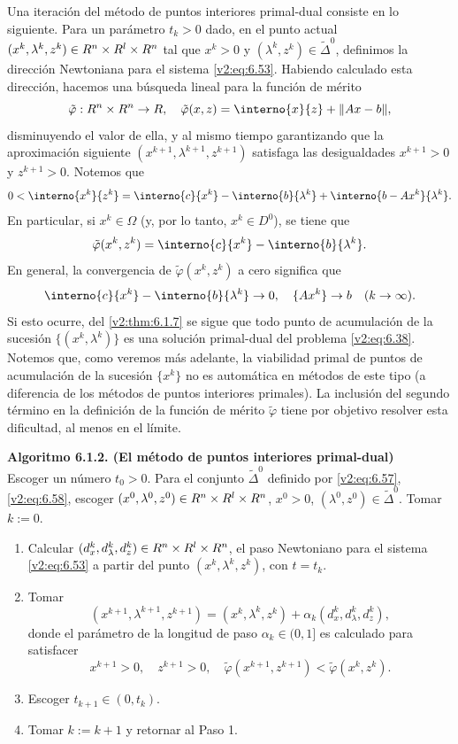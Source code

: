 Una iteración del método de puntos interiores primal-dual consiste en lo siguiente. Para un parámetro $t_k > 0$ dado, en el punto actual $(x^k, \lambda^k, z^k) \in R^n \times R^l \times R^n$ tal que $x^k > 0$ y $(\lambda^k, z^k) \in \tilde{\Delta}^0$, definimos la dirección Newtoniana para el sistema \eqref{v2:eq:6.53}. Habiendo calculado esta dirección, hacemos una búsqueda lineal para la función de mérito
\begin{equation}
    \tilde{\varphi} : \Rn \times \Rn \to \R, \quad \tilde{\varphi}(x, z) = \interno{x}{z} + \norm{Ax - b},
    \label{v2:eq:6.60}
\end{equation}
disminuyendo el valor de ella, y al mismo tiempo garantizando que la aproximación siguiente $(x^{k+1}, \lambda^{k+1}, z^{k+1})$ satisfaga las desigualdades $x^{k+1} > 0$ y $z^{k+1} > 0$. Notemos que
\[
    0 < \interno{x^k}{z^k} = \interno{c}{x^k} - \interno{b}{\lambda^k} + \interno{b - Ax^k}{\lambda^k}.
\]
En particular, si $x^k \in \Omega$ (y, por lo tanto, $x^k \in D^0$), se tiene que
\[
    \tilde{\varphi}(x^k, z^k) = \interno{c}{x^k} - \interno{b}{\lambda^k}.
\]
En general, la convergencia de $\tilde{\varphi}(x^k, z^k)$ a cero significa que
\[
    \interno{c}{x^k} - \interno{b}{\lambda^k} \to 0, \quad \{A x^k\} \to b \quad (k \to \infty).
\]
Si esto ocurre, del \cref{v2:thm:6.1.7} se sigue que todo punto de acumulación de la sucesión $\{(x^k, \lambda^k)\}$ es una solución primal-dual del problema \eqref{v2:eq:6.38}. Notemos que, como veremos más adelante, la viabilidad primal de puntos de acumulación de la sucesión $\{x^k\}$ no es automática en métodos de este tipo (a diferencia de los métodos de puntos interiores primales). La inclusión del segundo término en la definición de la función de mérito $\tilde{\varphi}$ tiene por objetivo resolver esta dificultad, al menos en el límite.

\vspace{0.3cm}
\noindent \textbf{Algoritmo 6.1.2. (El método de puntos interiores primal-dual)} \\
Escoger un número $t_0 > 0$. Para el conjunto $\tilde{\Delta}^0$ definido por \eqref{v2:eq:6.57}, \eqref{v2:eq:6.58}, escoger $(x^0, \lambda^0, z^0) \in R^n \times R^l \times R^n$, $x^0 > 0$, $(\lambda^0, z^0) \in \tilde{\Delta}^0$. Tomar $k := 0$.
\begin{enumerate}[label=\arabic*., itemsep=0.1cm, topsep=0.1cm]
    \item Calcular $(d_x^k, d_\lambda^k, d_z^k) \in R^n \times R^l \times R^n$, el paso Newtoniano para el sistema \eqref{v2:eq:6.53} a partir del punto $(x^k, \lambda^k, z^k)$, con $t = t_k$.
    \item Tomar
    \[
        (x^{k+1}, \lambda^{k+1}, z^{k+1}) = (x^k, \lambda^k, z^k) + \alpha_k (d_x^k, d_\lambda^k, d_z^k),
    \]
    donde el parámetro de la longitud de paso $\alpha_k \in (0, 1]$ es calculado para satisfacer
    \[
        x^{k+1} > 0, \quad z^{k+1} > 0, \quad \tilde{\varphi}(x^{k+1}, z^{k+1}) < \tilde{\varphi}(x^k, z^k).
    \]
    \item Escoger $t_{k+1} \in (0, t_k)$.
    \item Tomar $k := k + 1$ y retornar al Paso 1.
\end{enumerate}
\vspace{0.3cm}

